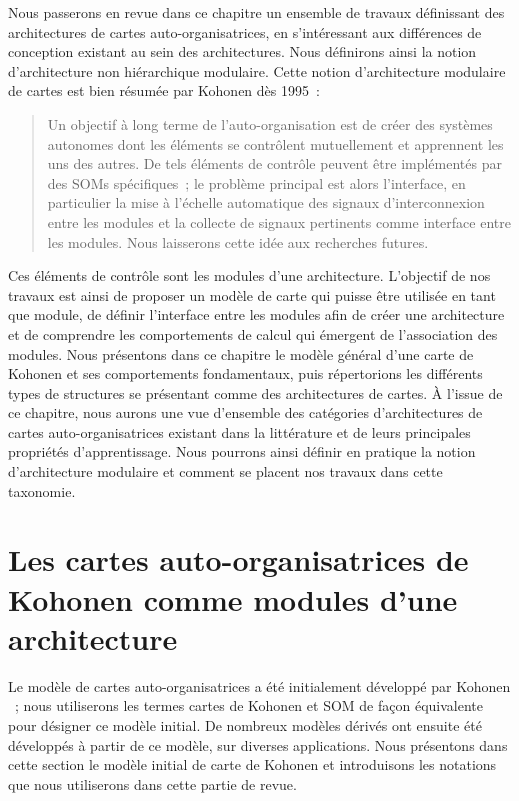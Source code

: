 \documentclass[../main]{subfiles}
\begin{document}
Nous passerons en revue dans ce chapitre un ensemble de travaux définissant des architectures de cartes auto-organisatrices, en s'intéressant aux différences de conception existant au sein des architectures. Nous définirons ainsi la notion d'architecture non hiérarchique modulaire.
Cette notion d'architecture modulaire de cartes est bien résumée par Kohonen dès 1995~:
\begin{quote}
Un objectif à long terme de l'auto-organisation est de créer des systèmes autonomes dont les éléments se contrôlent mutuellement et apprennent les uns des autres. De tels éléments de contrôle peuvent être implémentés par des SOMs spécifiques~; le problème principal est alors l'interface, en particulier la mise à l'échelle automatique des signaux d'interconnexion entre les modules et la collecte de signaux pertinents comme interface entre les modules. Nous laisserons cette idée aux recherches futures.
\cite{Kohonen1995SelfOrganizingM}
\end{quote}
Ces éléments de contrôle sont les modules d'une architecture. 
L'objectif de nos travaux est ainsi de proposer un modèle de carte qui puisse être utilisée en tant que module, de définir l'interface entre les modules afin de créer une architecture et de comprendre les comportements de calcul qui émergent de l'association des modules.
Nous présentons dans ce chapitre le modèle général d'une carte de Kohonen et ses comportements fondamentaux, puis répertorions les différents types de structures se présentant comme des architectures de cartes.
\`A l'issue de ce chapitre, nous aurons une vue d'ensemble des catégories d'architectures de cartes auto-organisatrices existant dans la littérature et de leurs principales propriétés d'apprentissage. Nous pourrons ainsi définir en pratique la notion d'architecture modulaire et comment se placent nos travaux dans cette taxonomie.

\section{Les cartes auto-organisatrices de Kohonen comme modules d'une architecture}\label{sec:som001}

Le modèle de cartes auto-organisatrices a été initialement développé par Kohonen \cite{Kohonen1982}~; nous utiliserons les termes cartes de Kohonen et SOM de façon équivalente pour désigner ce modèle initial.
De nombreux modèles dérivés ont ensuite été développés à partir de ce modèle, sur diverses applications.
Nous présentons dans cette section le modèle initial de carte de Kohonen et introduisons les notations que nous utiliserons dans cette partie de revue. 
\end{document}
